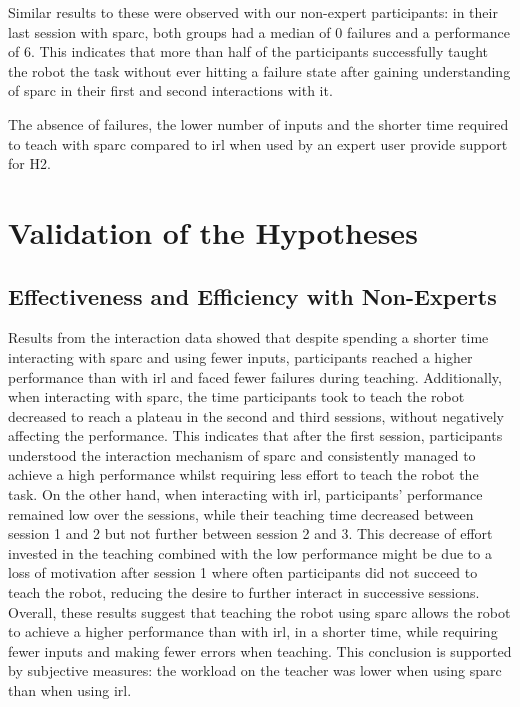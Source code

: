 Similar results to these were observed with our non-expert participants: in their last session with \gls{sparc}, both groups had a median of 0 failures and a performance of 6. This indicates that more than half of the participants successfully taught the robot the task without ever hitting a failure state after gaining understanding of \gls{sparc} in their first and second interactions with it.

The absence of failures, the lower number of inputs and the shorter time required to teach with \gls{sparc} compared to \gls{irl} when used by an expert user provide support for H2.

\section{Validation of the Hypotheses}

\subsection{Effectiveness and Efficiency with Non-Experts}
Results from the interaction data showed that despite spending a shorter time interacting with \gls{sparc} and using fewer inputs, participants reached a higher performance than with \gls{irl} and faced fewer failures during teaching. Additionally, when interacting with \gls{sparc}, the time participants took to teach the robot decreased to reach a plateau in the second and third sessions, without negatively affecting the performance. This indicates that after the first session, participants understood the interaction mechanism of \gls{sparc} and consistently managed to achieve a high performance whilst requiring less effort to teach the robot the task. On the other hand, when interacting with \gls{irl}, participants' performance remained low over the sessions, while their teaching time decreased between session 1 and 2 but not further between session 2 and 3. This decrease of effort invested in the teaching combined with the low performance might be due to a loss of motivation after session 1 where often participants did not succeed to teach the robot, reducing the desire to further interact in successive sessions. Overall, these results suggest that teaching the robot using \gls{sparc} allows the robot to achieve a higher performance than with \gls{irl}, in a shorter time, while requiring fewer inputs and making fewer errors when teaching. This conclusion is supported by subjective measures: the workload on the teacher was lower when using \gls{sparc} than when using \gls{irl}. 

